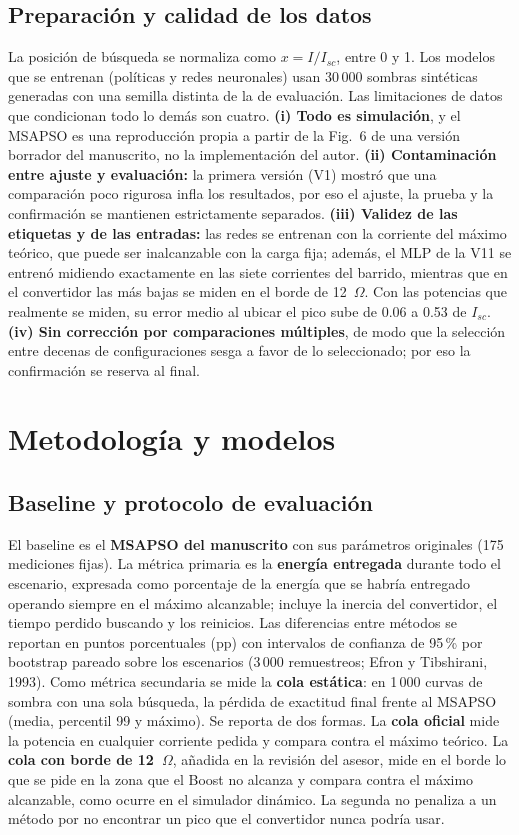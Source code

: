 \documentclass[letterpaper,11pt]{article}
\begin{document}
\subsection{Preparación y calidad de los datos}
La posición de búsqueda se normaliza como $x = I/I_{sc}$, entre 0 y 1. Los modelos que se entrenan (políticas y redes neuronales) usan 30\,000 sombras sintéticas generadas con una semilla distinta de la de evaluación. Las limitaciones de datos que condicionan todo lo demás son cuatro. \textbf{(i) Todo es simulación}, y el MSAPSO es una reproducción propia a partir de la Fig.~6 de una versión borrador del manuscrito, no la implementación del autor. \textbf{(ii) Contaminación entre ajuste y evaluación:} la primera versión (V1) mostró que una comparación poco rigurosa infla los resultados, por eso el ajuste, la prueba y la confirmación se mantienen estrictamente separados. \textbf{(iii) Validez de las etiquetas y de las entradas:} las redes se entrenan con la corriente del máximo teórico, que puede ser inalcanzable con la carga fija; además, el MLP de la V11 se entrenó midiendo exactamente en las siete corrientes del barrido, mientras que en el convertidor las más bajas se miden en el borde de 12~$\Omega$. Con las potencias que realmente se miden, su error medio al ubicar el pico sube de 0.06 a 0.53 de $I_{sc}$. \textbf{(iv) Sin corrección por comparaciones múltiples}, de modo que la selección entre decenas de configuraciones sesga a favor de lo seleccionado; por eso la confirmación se reserva al final.

\section{Metodología y modelos}

\subsection{Baseline y protocolo de evaluación}
El baseline es el \textbf{MSAPSO del manuscrito} con sus parámetros originales (175 mediciones fijas). La métrica primaria es la \textbf{energía entregada} durante todo el escenario, expresada como porcentaje de la energía que se habría entregado operando siempre en el máximo alcanzable; incluye la inercia del convertidor, el tiempo perdido buscando y los reinicios. Las diferencias entre métodos se reportan en puntos porcentuales (pp) con intervalos de confianza de 95\,\% por bootstrap pareado sobre los escenarios (3\,000 remuestreos; Efron y Tibshirani, 1993). Como métrica secundaria se mide la \textbf{cola estática}: en 1\,000 curvas de sombra con una sola búsqueda, la pérdida de exactitud final frente al MSAPSO (media, percentil 99 y máximo). Se reporta de dos formas. La \textbf{cola oficial} mide la potencia en cualquier corriente pedida y compara contra el máximo teórico. La \textbf{cola con borde de 12~$\Omega$}, añadida en la revisión del asesor, mide en el borde lo que se pide en la zona que el Boost no alcanza y compara contra el máximo alcanzable, como ocurre en el simulador dinámico. La segunda no penaliza a un método por no encontrar un pico que el convertidor nunca podría usar.
\end{document}
